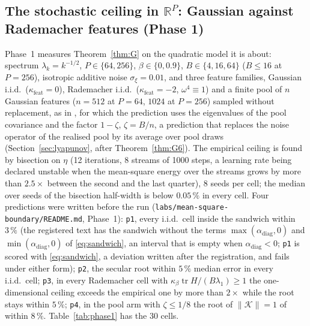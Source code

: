 \documentclass[11pt]{article}
\theoremstyle{remark}
\newcommand{\R}{\mathbb{R}}
\newcommand{\tr}{\operatorname{tr}}
\begin{document}
\subsection{The stochastic ceiling in \texorpdfstring{$\R^P$}{R\^P}: Gaussian against Rademacher features (Phase 1)}\label{sec:phase1}

Phase~1 measures Theorem~\ref{thm:G} on the quadratic model it is about: spectrum $\lambda_k=k^{-1/2}$, $P\in\{64,256\}$, $\beta\in\{0,0.9\}$, $B\in\{4,16,64\}$ ($B\le16$ at $P=256$), isotropic additive noise $\sigma_\xi=0.01$, and three feature families, Gaussian i.i.d.\ ($\kappa_{\mathrm{feat}}=0$), Rademacher i.i.d.\ ($\kappa_{\mathrm{feat}}=-2$, $\omega^4\equiv1$) and a finite pool of $n$ Gaussian features ($n=512$ at $P=64$, $1024$ at $P=256$) sampled without replacement, as in \citet{lee2022minibatch}, for which the prediction uses the eigenvalues of the pool covariance and the factor $1-\zeta$, $\zeta=B/n$, a prediction that replaces the noise operator of the realised pool by its average over pool draws (Section~\ref{sec:lyapunov}, after Theorem~\ref{thm:G6}). The empirical ceiling is found by bisection on $\eta$ (12 iterations, 8 streams of 1000 steps, a learning rate being declared unstable when the mean-square energy over the streams grows by more than $2.5\times$ between the second and the last quarter), 8 seeds per cell; the median over seeds of the bisection half-width is below $0.05\,\%$ in every cell. Four predictions were written before the run (\texttt{labs/mean-square-boundary/README.md}, Phase~1): \texttt{p1}, every i.i.d.\ cell inside the sandwich within $3\,\%$ (the registered text has the sandwich without the terms $\max(\alpha_{\mathrm{diag}},0)$ and $\min(\alpha_{\mathrm{diag}},0)$ of \eqref{eq:sandwich}, an interval that is empty when $\alpha_{\mathrm{diag}}<0$; \texttt{p1} is scored with \eqref{eq:sandwich}, a deviation written after the registration, and fails under either form); \texttt{p2}, the secular root within $5\,\%$ median error in every i.i.d.\ cell; \texttt{p3}, in every Rademacher cell with $\kappa_\beta\tr H/(B\lambda_1)\ge1$ the one-dimensional ceiling exceeds the empirical one by more than $2\times$ while the root stays within $5\,\%$; \texttt{p4}, in the pool arm with $\zeta\le1/8$ the root of $\|\mathcal K\|=1$ of \citet{lee2022minibatch} within $8\,\%$. Table~\ref{tab:phase1} has the 30 cells.
\end{document}

